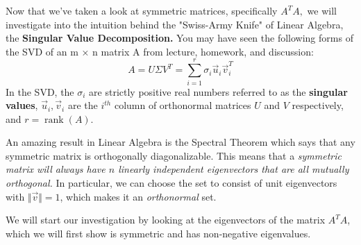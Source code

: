 


Now that we’ve taken a look at symmetric matrices, specifically $A^{T} A,$ we will investigate into the intuition behind the "Swiss-Army Knife" of Linear Algebra, the \textbf{Singular Value Decomposition.} You may have seen the following forms of the SVD of an m × n matrix A from lecture, homework, and discussion:
\begin{equation}
  A = U \Sigma V^{T} = \sum_{i=1}^{r} \sigma_{i} \vec{u}_{i} \vec{v}_{i}^T
\end{equation}
In the SVD, the $\sigma_{i}$ are strictly positive real numbers referred to as the \textbf{singular values}, $\vec{u}_{i}, \vec{v}_{i}$ are the $i^{th}$ column of orthonormal matrices $U$ and $V$ respectively, and $r = \operatorname{rank}(A)$.

An amazing result in Linear Algebra is the Spectral Theorem which says that any symmetric matrix is orthogonally diagonalizable. 
This means that a \textit{symmetric matrix will always have $n$ linearly independent eigenvectors that are all mutually orthogonal.} In particular, we can choose the set to consist of unit eigenvectors with $\Vert \vec{v} \Vert = 1$, which makes it an \textit{orthonormal} set.

We will start our investigation by looking at the eigenvectors of the matrix $A^T A$, which we will first show is symmetric and has non-negative eigenvalues.


